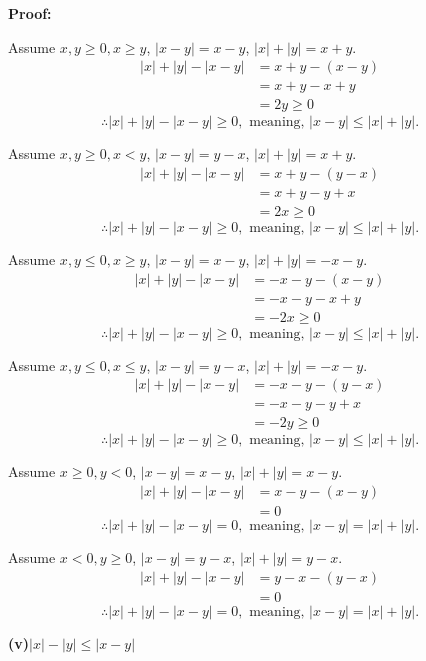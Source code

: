 \documentclass[a4paper,12pt]{report}
\begin{document}
\noindent
\textbf{Proof: }

\noindent
Assume $x, y\geq 0, x\geq y$, $|x-y|=x-y$, $|x|+|y| = x+y$.
\begin{align*}
 |x|+|y|-|x-y| & =x+y -(x-y) \\
 			   & =x+y -x+y\\
 			   & =2y\geq 0
\end{align*}
\[\therefore |x|+|y|-|x-y|\geq 0, \text{ meaning, } |x-y|\leq|x|+|y|.\]

\noindent
Assume $x, y\geq 0, x< y$, $|x-y|=y-x$, $|x|+|y| = x+y$.
\begin{align*}
 |x|+|y|-|x-y| & =x+y -(y-x) \\
 			   & =x+y -y+x\\
 			   & =2x\geq 0
\end{align*}
\[\therefore |x|+|y|-|x-y|\geq 0, \text{ meaning, } |x-y|\leq|x|+|y|.\]

\noindent
Assume $x, y\leq 0, x\geq y$, $|x-y|=x-y$, $|x|+|y| = -x-y$.
\begin{align*}
 |x|+|y|-|x-y| & =-x-y -(x-y) \\
 			   & =-x-y -x+y\\
 			   & =-2x\geq 0
\end{align*}
\[\therefore |x|+|y|-|x-y|\geq 0, \text{ meaning, } |x-y|\leq|x|+|y|.\]

\noindent
Assume $x, y\leq 0, x\leq y$, $|x-y|=y-x$, $|x|+|y| = -x-y$.
\begin{align*}
 |x|+|y|-|x-y| & =-x-y -(y-x) \\
 			   & =-x-y -y+x\\
 			   & =-2y\geq 0
\end{align*}
\[\therefore |x|+|y|-|x-y|\geq 0, \text{ meaning, } |x-y|\leq|x|+|y|.\]

\noindent
Assume $x \geq 0, y < 0$, $|x-y|=x-y$, $|x|+|y| = x-y$.
\begin{align*}
 |x|+|y|-|x-y| & =x-y -(x-y) \\
 			   & =0
\end{align*}
\[\therefore |x|+|y|-|x-y|= 0, \text{ meaning, } |x-y|=|x|+|y|.\]

\noindent
Assume $x < 0, y \geq 0$, $|x-y|=y-x$, $|x|+|y| = y-x$.
\begin{align*}
 |x|+|y|-|x-y| & =y-x -(y-x) \\
 			   & =0
\end{align*}
\[\therefore |x|+|y|-|x-y|= 0, \text{ meaning, } |x-y|=|x|+|y|.\]

\noindent
\textbf{(v)}$ |x|-|y|\leq |x-y|$
\end{document}

